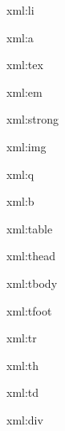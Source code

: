 \startxmlsetups xml:li
  \startitem {} \stopitem
\stopxmlsetups

\startxmlsetups xml:a
  \href{\xmlflush{#1}}{}
\stopxmlsetups

\startxmlsetups xml:tex
\stopxmlsetups

\startxmlsetups xml:em
\stopxmlsetups

\startxmlsetups xml:strong
\stopxmlsetups

\startxmlsetups xml:img
  \starttexcode
  \stoptexcode
\stopxmlsetups

\startxmlsetups xml:q
\stopxmlsetups

\startxmlsetups xml:b
\stopxmlsetups

\startxmlsetups xml:table
  \blank[medium]
  \startembeddedxtable
  \stopembeddedxtable
  \blank[medium]
\stopxmlsetups

\startxmlsetups xml:thead
	\startxtablebody[head]
	\stopxtablebody
\stopxmlsetups

\startxmlsetups xml:tbody
	\startxtablebody[body]
	\stopxtablebody
\stopxmlsetups

\startxmlsetups xml:tfoot
	\startxtablebody[foot]
	\stopxtablebody
\stopxmlsetups

\startxmlsetups xml:tr
  \startxrow
  \stopxrow
\stopxmlsetups

\startxmlsetups xml:th
  \startxcell
  \stopxcell
\stopxmlsetups

\startxmlsetups xml:td
  \startxcell
  \stopxcell
\stopxmlsetups

\startxmlsetups xml:div
  \stop
\stopxmlsetups


